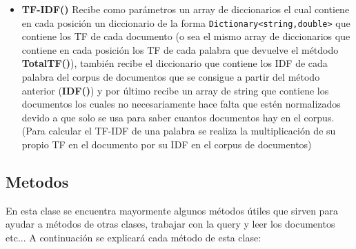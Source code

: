 \documentclass[a4paper,12pt]{article}
\begin{document}
\begin{itemize}
    \item \textbf{TF-IDF()}
Recibe como parámetros un array de diccionarios el cual contiene en cada posición un diccionario de la forma \texttt{Dictionary\textless string,double\textgreater} 
que contiene los TF de cada documento (o sea el mismo array de diccionarios que contiene en cada posición los TF de cada palabra que devuelve el métdodo 
\textbf{TotalTF()}), también recibe el diccionario que contiene los IDF de cada palabra del corpus de documentos que se consigue a partir del método anterior 
(\textbf{IDF()}) y por último recibe un array de string que contiene los documentos los cuales no necesariamente hace falta que estén normalizados devido a que 
solo se usa para saber cuantos documentos hay en el corpus. (Para calcular el TF-IDF de una palabra se realiza la multiplicación de su propio TF en el documento  por su IDF en el corpus de documentos)
\end{itemize}

\subsection{Metodos}\label{sub:metodos}

En esta clase se encuentra mayormente algunos métodos útiles que sirven para ayudar a métodos de otras clases, trabajar con la query y leer los documentos 
etc... A continuación se explicará cada método de esta clase:
\end{document}

